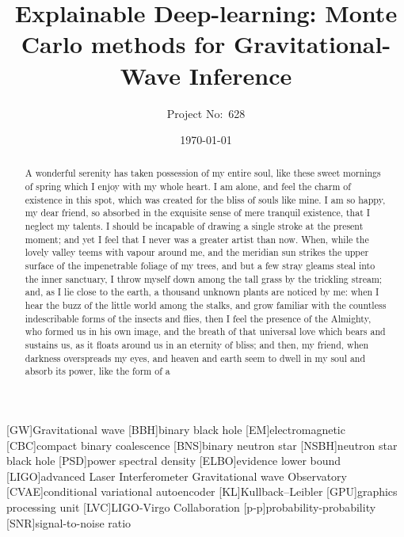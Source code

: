 \documentclass[aps,superscriptaddress,twocolumn,nopreprintnumbers,floatfix,groupedaddress]{revtex4-1}
\begin{document}
\raggedbottom

\title{Explainable Deep-learning: Monte Carlo methods for Gravitational-Wave Inference}

\author{Project No:~628}
%

\date{\today}

\begin{abstract}
A wonderful serenity has taken possession of my entire soul, like these sweet mornings of spring which I enjoy with my whole heart. I am alone, and feel the charm of existence in this spot, which was created for the bliss of souls like mine. I am so happy, my dear friend, so absorbed in the exquisite sense of mere tranquil existence, that I neglect my talents. I should be incapable of drawing a single stroke at the present moment; and yet I feel that I never was a greater artist than now. When, while the lovely valley teems with vapour around me, and the meridian sun strikes the upper surface of the impenetrable foliage of my trees, and but a few stray gleams steal into the inner sanctuary, I throw myself down among the tall grass by the trickling stream; and, as I lie close to the earth, a thousand unknown plants are noticed by me: when I hear the buzz of the little world among the stalks, and grow familiar with the countless indescribable forms of the insects and flies, then I feel the presence of the Almighty, who formed us in his own image, and the breath of that universal love which bears and sustains us, as it floats around us in an eternity of bliss; and then, my friend, when darkness overspreads my eyes, and heaven and earth seem to dwell in my soul and absorb its power, like the form of a
\end{abstract}

\maketitle

[GW]{Gravitational wave}
[BBH]{binary black hole}
[EM]{electromagnetic}
[CBC]{compact binary coalescence}
[BNS]{binary neutron star}
[NSBH]{neutron star black hole}
[PSD]{power spectral density}
[ELBO]{evidence lower bound}
[LIGO]{advanced Laser Interferometer Gravitational wave Observatory}
[CVAE]{conditional variational autoencoder}
[KL]{Kullback--Leibler}
[GPU]{graphics processing unit}
[LVC]{LIGO-Virgo Collaboration}
[p-p]{probability-probability}
[SNR]{signal-to-noise ratio}
\end{document}
